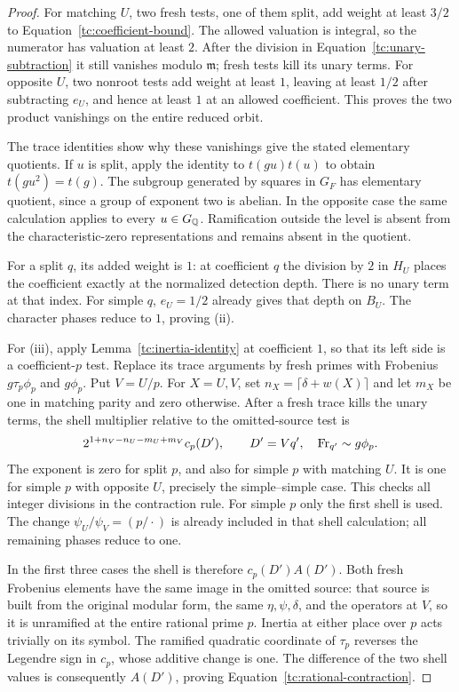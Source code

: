 \begin{proof}
For matching $U$, two fresh tests, one of them split, add weight at
least $3/2$ to Equation~\eqref{tc:coefficient-bound}.  The allowed
valuation is integral, so the numerator has valuation at least $2$.
After the division in Equation~\eqref{tc:unary-subtraction} it still
vanishes modulo $\mathfrak m$; fresh tests kill its unary terms.
For opposite $U$, two nonroot tests add weight at least $1$, leaving
at least $1/2$ after subtracting $e_U$, and hence at least $1$ at an
allowed coefficient.  This proves the two product vanishings on the
entire reduced orbit.

The trace identities show why these vanishings give the stated
elementary quotients.  If $u$ is split, apply the identity to
$t(gu)t(u)$ to obtain $t(gu^2)=t(g)$.  The subgroup generated by
squares in $G_F$ has elementary quotient, since a group of exponent
two is abelian.  In the opposite case the same calculation applies
to every $u\in G_\mathbb Q$.  Ramification outside the level is absent from
the characteristic-zero representations and remains absent in the
quotient.

For a split $q$, its added weight is $1$: at coefficient $q$ the
division by $2$ in $H_U$ places the coefficient exactly at the
normalized detection depth.  There is no unary term at that index.
For simple $q$, $e_U=1/2$ already gives that depth on $B_U$.
The character phases reduce to $1$, proving (ii).

For (iii), apply Lemma~\ref{tc:inertia-identity} at coefficient $1$,
so that its left side is a coefficient-$p$ test. Replace its trace
arguments by fresh primes with Frobenius $g\tau_p\phi_p$ and
$g\phi_p$. Put $V=U/p$. For $X=U,V$, set
$n_X=\lceil\delta+w(X)\rceil$ and let $m_X$ be one in matching
parity and zero otherwise. After a fresh
trace kills the unary terms, the shell multiplier relative to the
omitted-source test is
\[
 2^{1+n_V-n_U-m_U+m_V}c_p(D'),
 \qquad D'=Vq',\quad \operatorname{Fr}_{q'}\sim g\phi_p.
\]
The exponent is zero for split $p$, and also for simple $p$ with
matching $U$. It is one for simple $p$ with opposite $U$, precisely
the simple--simple case. This checks all integer divisions in the
contraction rule. For simple $p$ only the first shell is used.
The change $\psi_U/\psi_V=(p/\cdot)$ is already included in that
shell calculation; all remaining phases reduce to one.

In the first three cases the shell is therefore $c_p(D')A(D')$.
Both fresh Frobenius elements have the same image in the omitted
source: that source is built from the original modular form, the same
$\eta,\psi,\delta$, and the operators at $V$, so it is unramified at the entire rational prime
$p$. Inertia at either place over $p$ acts trivially on its symbol.
The ramified quadratic coordinate of $\tau_p$ reverses the Legendre
sign in $c_p$, whose additive change is one. The difference of the
two shell values is consequently $A(D')$, proving
Equation~\eqref{tc:rational-contraction}.


\end{proof}

